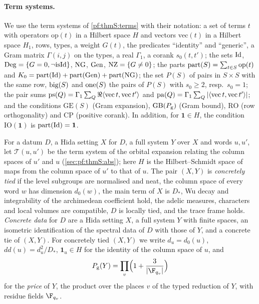 \paragraph{Term systems.}
We use the term systems of \cref{pf:thmS:terms} with their notation: a set of terms $t$ with operators $\mathrm{op}(t)$ in a
Hilbert space $H$ and vectors $\mathrm{vec}(t)$ in a Hilbert space $H_1$, rows, types, a weight $G(t)$, the predicates
``identity'' and ``generic'', a Gram matrix $\Gamma(i,j)$ on the types, a real $\Gamma_1$, a corank $s_0(t,t')$; the sets
$\mathrm{Id}$, $\mathrm{Deg}=\{G=0,\neg\mathrm{isId}\}$, $\mathrm{NG}$, $\mathrm{Gen}$, $\mathrm{NZ}=\{G\ne0\}$; the parts
$\operatorname{part}(S)=\sum_{t\in S}\mathrm{op}(t)$ and $K_0=\operatorname{part}(\mathrm{Id})+\operatorname{part}(\mathrm{Gen})+\operatorname{part}(\mathrm{NG})$;
the set $P(S)$ of pairs in $S\times S$ with the same row, $\operatorname{big}(S)$ and $\operatorname{one}(S)$ the pairs of $P(S)$ with
$s_0\ge2$, resp.\ $s_0=1$; the pair sums $\operatorname{ps}(Q)=\Gamma_1\sum_Q\Re\langle\mathrm{vec}\,t,\mathrm{vec}\,t'\rangle$ and
$\operatorname{pa}(Q)=\Gamma_1\sum_Q|\langle\mathrm{vec}\,t,\mathrm{vec}\,t'\rangle|$; and the conditions $\mathrm{GE}(S)$ (Gram
expansion), $\mathrm{GB}(P_{\mathrm g})$ (Gram bound), $\mathrm{RO}$ (row orthogonality) and $\mathrm{CP}$ (positive corank). In
addition, for $\mathbf 1\in H$, the condition $\mathrm{IO}(\mathbf 1)$ is $\operatorname{part}(\mathrm{Id})=\mathbf 1$.

For a datum $D$, a Hida setting $X$ for $D$, a full system $Y$ over $X$ and words $u,u'$, let $\mathcal T(u,u')$ be the term
system of the orbital expansion relating the column spaces of $u'$ and $u$ (\cref{sec:pf:thmS:abs}); here $H$ is the
Hilbert--Schmidt space of maps from the column space of $u'$ to that of $u$. The pair $(X,Y)$ is \emph{concretely tied} if the
level subgroups are normalised and neat, the column space of every word $w$ has dimension $d_0(w)$, the main term of $X$ is
$D_*$, Wu decay and integrability of the archimedean coefficient hold, the adelic measures, characters and local volumes
are compatible, $D$ is locally tied, and the trace frame holds. \emph{Concrete data} for $D$ are a Hida setting $X$, a full
system $Y$ with finite spaces, an isometric identification of the spectral data of $D$ with those of $Y$, and a concrete tie
of $(X,Y)$. For concretely tied $(X,Y)$ we write $d_u=d_0(u)$, $dd(u)=d_u^2/D_*$, $\mathbf 1_u\in H$ for the identity of the
column space of $u$, and
\[
\openzeroPg(Y)=\prod_v\Bigl(1+\frac3{|\F_{q_v}|}\Bigr)
\]
for the \emph{price} of $Y$, the product over the places $v$ of the typed reduction of $Y$, with residue fields $\F_{q_v}$.
\ \ 

